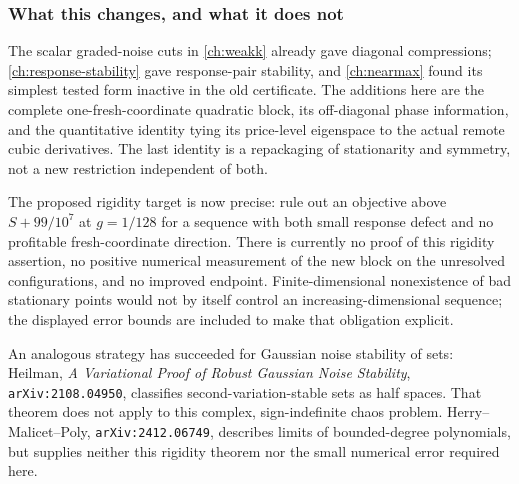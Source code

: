 \subsubsection{What this changes, and what it does not}
The scalar graded-noise cuts in \autoref{ch:weakk} already gave diagonal
compressions; \autoref{ch:response-stability} gave response-pair stability, and \autoref{ch:nearmax}
found its simplest tested form inactive in the old certificate.
The additions here are the complete one-fresh-coordinate quadratic block,
its off-diagonal phase information, and the quantitative identity tying
its price-level eigenspace to the actual remote cubic derivatives.
The last identity is a repackaging of stationarity and symmetry, not a
new restriction independent of both.

The proposed rigidity target is now precise: rule out an objective above
$S+99/10^7$ at $g=1/128$ for a sequence with both small response defect
and no profitable fresh-coordinate direction. There is currently no proof
of this rigidity assertion, no positive numerical measurement of the new
block on the unresolved configurations, and no improved endpoint.
Finite-dimensional nonexistence of bad stationary points would not by
itself control an increasing-dimensional sequence; the displayed error
bounds are included to make that obligation explicit.

An analogous strategy has succeeded for Gaussian noise stability of sets:
Heilman, \emph{A Variational Proof of Robust Gaussian Noise Stability},
\texttt{arXiv:2108.04950}, classifies second-variation-stable sets as
half spaces. That theorem does not apply to this complex, sign-indefinite
chaos problem. Herry--Malicet--Poly, \texttt{arXiv:2412.06749}, describes
limits of bounded-degree polynomials, but supplies neither this rigidity
theorem nor the small numerical error required here.

